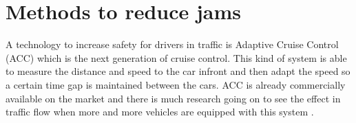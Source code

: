 \section{Methods to reduce jams}
A technology to increase safety for drivers in traffic is Adaptive Cruise Control (ACC) which is the next generation of cruise control. This kind of system is able to measure the distance and speed to the car infront and then adapt the speed so a certain time gap is maintained between the cars. ACC is already commercially available on the market and there is much research going on to see the effect in traffic flow when more and more vehicles are equipped with this system \cite{acc}.